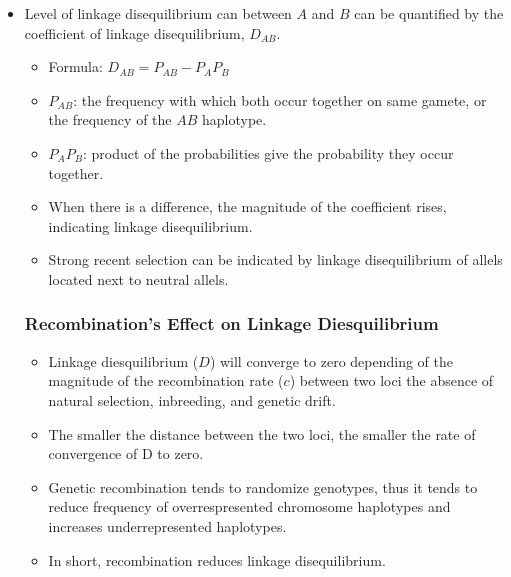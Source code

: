 \documentclass[12pt,a4paper]{article}
\begin{document}
\begin{itemize}
\begin{itemize}
        \end{itemize}
    \item Level of linkage disequilibrium can between \(A\) and \(B\) can be quantified by the {\color{o-Sun}coefficient of linkage disequilibrium, \(D_{AB}\)}.
        \begin{itemize}
            \item Formula: \(D_{AB}=P_{AB} - P_{A}P_{B}\)
            \item \(P_{AB}\): the frequency with which both occur together on same gamete, or the frequency of the \(AB\) haplotype.
            \item \(P_AP_B\): product of the probabilities give the probability they occur together.
            \item When there is a difference, the magnitude of the coefficient rises, indicating linkage disequilibrium.
            \item Strong recent selection can be indicated by linkage disequilibrium of allels located next to neutral allels.
        \end{itemize}
    \subsubsection{Recombination's Effect on  Linkage Diesquilibrium}
    \begin{itemize}
        \item Linkage diesquilibrium (\(D\)) will converge to zero depending of the magnitude of the recombination rate (\(c\)) between two loci the absence of natural selection, inbreeding, and genetic drift.
        \item The smaller the distance between the two loci, the smaller the rate of convergence of D to zero.
        \item Genetic recombination tends to randomize genotypes, thus it tends to reduce frequency of overrespresented chromosome haplotypes and increases underrepresented haplotypes. 
        \item In short, recombination reduces linkage disequilibrium.
    \end{itemize}
\end{itemize}
\end{document}
